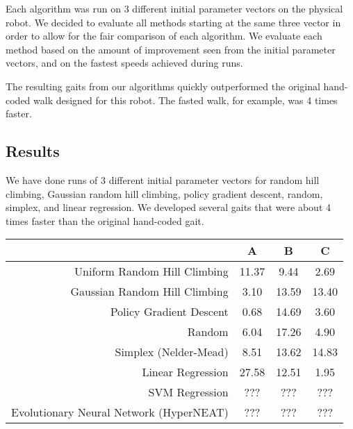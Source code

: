 Each algorithm was run on 3 different initial parameter vectors on the
physical robot. We decided to evaluate all methods starting at the
same three vector in order to allow for the fair comparison of each
algorithm.  We evaluate
each method based on the amount of improvement seen from the initial
parameter vectors, and on the fastest speeds achieved during runs.

The resulting gaits from our algorithms quickly outperformed the original
hand-coded walk designed for this robot. The fasted walk, for example, was
4 times faster.

\subsection{Results}

We have done runs of 
3 different initial parameter vectors for random hill climbing, 
Gaussian random hill climbing, policy gradient descent, random,
simplex, and linear regression. We developed several
gaits that were about 4 times faster than the original hand-coded gait. 



\begin{tabular}{|r|c|c|c|}
\hline
                                         & A       & B      & C      \\
\hline
Uniform Random Hill Climbing             & 11.37   & 9.44   & 2.69   \\
\hline
Gaussian Random Hill Climbing            & 3.10    & 13.59  & 13.40  \\
\hline
Policy Gradient Descent                  & 0.68    & 14.69  & 3.60   \\
\hline
Random                                   & 6.04    & 17.26  & 4.90   \\
\hline
Simplex (Nelder-Mead)                    & 8.51    & 13.62  & 14.83  \\
\hline
Linear Regression                        & 27.58   & 12.51  & 1.95   \\
\hline
SVM Regression                           & ???     & ???    & ???    \\
\hline
Evolutionary Neural Network (HyperNEAT)  & ???     & ???    & ???    \\
\hline
\end{tabular}



